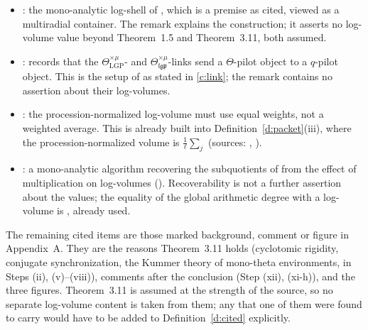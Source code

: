 \documentclass[11pt]{article}
\theoremstyle{plain}
\theoremstyle{definition}
\theoremstyle{remark}
\newcommand{\vol}{\operatorname{vol}}
\newcommand{\Poss}{\mathcal P}
\newcommand{\cO}{\mathcal O}
\begin{document}
\begin{itemize}[leftmargin=2em]
  an interpretive summary of the proof just given---the $\Theta$-link as a gluing
  isomorphism, the comparison of the $0$- and $1$-columns, and a toy model of the
  (xi-e)/(xi-f) inference itself. Its two assertions with log-volume content are that
  log-link compatibility of log-volumes is the same in the two columns (already
  \cite[Prop.~3.9(iv)]{IUT3} and the end of \cite[Thm.~3.11(ii)]{IUT3}, item~2 above)
  and that the $\cO^\times$-indeterminacy in relating regions to arithmetic line bundles
  is absorbed by the holomorphic hull (already \cite[Rem.~3.9.5(vii)--(x)]{IUT3}).
  The remaining point, that the $q$-pilot has no multiradial analogue, is the reason
  $\vol(q)$ enters Definitions~\ref{d:packet}--\ref{d:cited} as a fixed value while the
  $\Theta$-side varies in $\Poss$. No separate log-volume statement remains.
\item \cite[Rem.~1.5.2(i)--(iii)]{IUT3}: the mono-analytic log-shell of
  \cite[Thm.~1.5(iii)--(v)]{IUT3}, which is a premise as cited, viewed as a multiradial
  container. The remark explains the construction; it asserts no log-volume value beyond
  Theorem~1.5 and Theorem~3.11, both assumed.
\item \cite[Rem.~3.8.1]{IUT3}: records that the $\Theta^{\times\mu}_{\mathrm{LGP}}$- and
  $\Theta^{\times\mu}_{\mathfrak{lgp}}$-links send a $\Theta$-pilot object to a $q$-pilot
  object. This is the setup of \cite[Def.~3.8(ii)]{IUT3} as stated in \ref{c:link}; the
  remark contains no assertion about their log-volumes.
\item \cite[Rem.~3.9.3]{IUT3}: the procession-normalized log-volume must use equal
  weights, not a weighted average. This is already built into
  Definition~\ref{d:packet}(iii), where the procession-normalized volume is
  $\frac1\ell\sum_j$ (sources: \cite[Rem.~3.1.1(ii)--(iv)]{IUT3},
  \cite[Prop.~3.9(i)(ii)]{IUT3}).
\item \cite[Rem.~3.9.2]{IUT3}: a mono-analytic algorithm recovering the subquotients of
  \cite[Prop.~3.9(iii)]{IUT3} from the effect of multiplication on log-volumes
  (\cite[Prop.~3.9(ii)]{IUT3}). Recoverability is not a further assertion about the
  values; the equality of the global arithmetic degree with a log-volume is
  \cite[Prop.~3.9(iii)]{IUT3}, already used.
\end{itemize}
The remaining cited items are those marked background, comment or figure in
Appendix~A. They are the reasons Theorem~3.11 holds (cyclotomic rigidity, conjugate
synchronization, the Kummer theory of mono-theta environments, in Steps
(ii), (v)--(viii)), comments after the conclusion (Step (xii), (xi-h)), and the three
figures. Theorem~3.11 is assumed at the strength of the source, so no separate
log-volume content is taken from them; any that one of them were found to carry would
have to be added to Definition~\ref{d:cited} explicitly.
\end{document}
